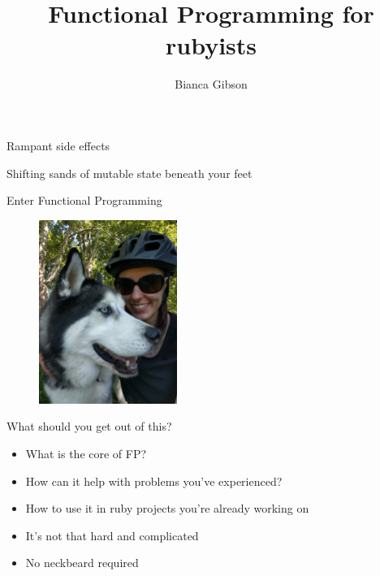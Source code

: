 \documentclass[aspectratio=169]{beamer}
\title{Functional Programming for rubyists}
\author{Bianca Gibson}
\institute{Ruby Conf AU 2016}
\date{}
\begin{document}
\frame{\titlepage}

\begin{frame}
  \begin{center}
    \Huge Rampant side effects
  \end{center}
\end{frame}

\begin{frame}
  \begin{center}
    \Huge Shifting sands of mutable state beneath your feet
  \end{center}
\end{frame}

\begin{frame}
  \begin{center}
    \Huge Enter Functional Programming
  \end{center}
\end{frame}

\begin{frame}
  \begin{figure}[p]
    \includegraphics[width=0.4\textwidth]{./assets/portrait.jpg}
  \end{figure}
\end{frame}

\begin{frame}
  \begin{center}
    \Huge What should you get out of this?
  \end{center}
  \begin{itemize}
    \item What is the core of FP?
    \item How can it help with problems you've experienced?
    \item How to use it in ruby projects you're already working on
    \item It's not that hard and complicated
    \item No neckbeard required
  \end{itemize}
\end{frame}
\end{document}
